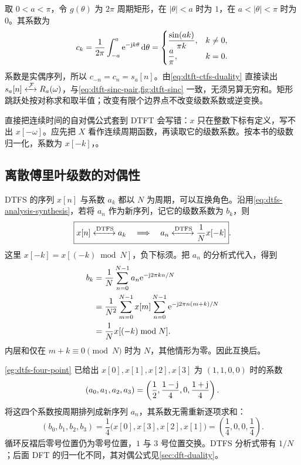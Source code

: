\begin{example}
  取 $0<a<\pi$，令 $g(\theta)$ 为 $2\pi$ 周期矩形，在 $|\theta|<a$ 时为 $1$，在 $a<|\theta|<\pi$ 时为 $0$。其系数为
  \[
    c_k=\frac1{2\pi}\int_{-a}^{a}\mathrm{e}^{-\mathrm{j} k\theta}\mathop{}\!\mathrm{d}\theta
    =\begin{cases}
      \displaystyle\frac{\sin(ak)}{\pi k},&k\ne0,\\[4pt]
      \displaystyle\frac a\pi,&k=0.
    \end{cases}
  \]
  系数是实偶序列，所以 $c_{-n}=c_n=s_a[n]$。由\cref{eq:dtft-ctfs-duality} 直接读出
  $s_a[n]\mathrel{\xleftrightarrow{\,\mathcal{F}\,}} R_a(\omega)$，与\cref{eq:dtft-sinc-pair,fig:dtft-sinc} 一致，无须另算无穷和。矩形跳跃处按对称求和取半值；改变有限个边界点不改变级数系数或逆变换。
\end{example}

\begin{pitfall}
  直接把连续时间的自对偶公式套到 DTFT 会写错：$x$ 只在整数下标有定义，写不出 $x[-\omega]$。应先把 $X$ 看作连续周期函数，再读取它的级数系数。按本书的级数归一化，系数为 $x[-k]$，。
\end{pitfall}

\subsection{离散傅里叶级数的对偶性}
\label{sec:dtfs-duality}

DTFS 的序列 $x[n]$ 与系数 $a_k$ 都以 $N$ 为周期，可以互换角色。沿用\cref{eq:dtfs-analysis-synthesis}，若将 $a_n$ 作为新序列，记它的级数系数为 $b_k$，则
\begin{equation}
  \boxed{x[n]\xleftrightarrow{\mathrm{DTFS}}a_k
    \quad\Longrightarrow\quad
    a_n\xleftrightarrow{\mathrm{DTFS}}\frac1N x[-k]}.
  \label{eq:dtfs-duality}
\end{equation}
这里 $x[-k]=x[(-k)\bmod N]$，负下标须。把 $a_n$ 的分析式代入，得到
\begin{align*}
  b_k
    &=\frac1N\sum_{n=0}^{N-1}a_n\mathrm{e}^{-\mathrm{j}2\pi kn/N}\\
    &=\frac1{N^2}\sum_{m=0}^{N-1}x[m]
        \sum_{n=0}^{N-1}\mathrm{e}^{-\mathrm{j}2\pi n(m+k)/N}\\
    &=\frac1N x[(-k)\bmod N].
\end{align*}
内层和仅在 $m+k\equiv0\pmod N$ 时为 $N$，其他情形为零。因此互换后。

\begin{example}[四周期序列与系数互换]
  \cref{eg:dtfs-four-point} 已给出 $x[0],x[1],x[2],x[3]$ 为 $(1,1,0,0)$ 时的系数
  \[
    (a_0,a_1,a_2,a_3)
      =\left(\frac12,\frac{1-\mathrm{j}}{4},0,\frac{1+\mathrm{j}}{4}\right).
  \]
  将这四个系数按周期排列成新序列 $a_n$，其系数无需重新逐项求和：
  \[
    (b_0,b_1,b_2,b_3)
      =\frac14\bigl(x[0],x[3],x[2],x[1]\bigr)
      =\left(\frac14,0,0,\frac14\right).
  \]
  循环反褶后零号位置仍为零号位置，$1$ 与 $3$ 号位置交换。DTFS 分析式带有 $1/N$；后面 DFT 的归一化不同，其对偶公式见\cref{sec:dft-duality}。
\end{example}

